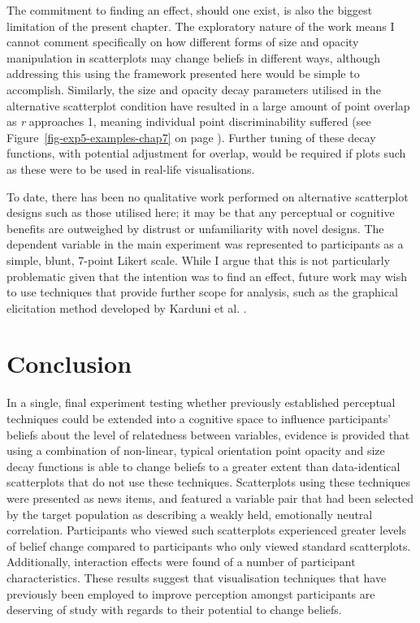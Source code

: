 \documentclass[../main.tex]{subfiles}
\begin{document}
The commitment to finding an effect, should one exist, is also the
biggest limitation of the present chapter. The exploratory nature of the
work means I cannot comment specifically on how different forms of size
and opacity manipulation in scatterplots may change beliefs in different
ways, although addressing this using the framework presented here would
be simple to accomplish. Similarly, the size and opacity decay
parameters utilised in the alternative scatterplot condition have
resulted in a large amount of point overlap as \emph{r} approaches 1,
meaning individual point discriminability suffered (see
Figure~\ref{fig-exp5-examples-chap7} on page
\pageref{fig-exp5-examples-chap7}). Further tuning of these decay
functions, with potential adjustment for overlap, would be required if
plots such as these were to be used in real-life visualisations.

To date, there has been no qualitative work performed on alternative
scatterplot designs such as those utilised here; it may be that any
perceptual or cognitive benefits are outweighed by distrust or
unfamiliarity with novel designs. The dependent variable in the main
experiment was represented to participants as a simple, blunt, 7-point
Likert scale. While I argue that this is not particularly problematic
given that the intention was to find an effect, future work may wish to
use techniques that provide further scope for analysis, such as the
graphical elicitation method developed by Karduni et al.
\cite{karduni_2021, karduni_2023}.

\section{Conclusion}\label{conclusion-e5}

In a single, final experiment testing whether previously established
perceptual techniques could be extended into a cognitive space to
influence participants' beliefs about the level of relatedness between
variables, evidence is provided that using a combination of non-linear,
typical orientation point opacity and size decay functions is able to
change beliefs to a greater extent than data-identical scatterplots that
do not use these techniques. Scatterplots using these techniques were
presented as news items, and featured a variable pair that had been
selected by the target population as describing a weakly held,
emotionally neutral correlation. Participants who viewed such
scatterplots experienced greater levels of belief change compared to
participants who only viewed standard scatterplots. Additionally,
interaction effects were found of a number of participant
characteristics. These results suggest that visualisation techniques
that have previously been employed to improve perception amongst
participants are deserving of study with regards to their potential to
change beliefs.
\end{document}
